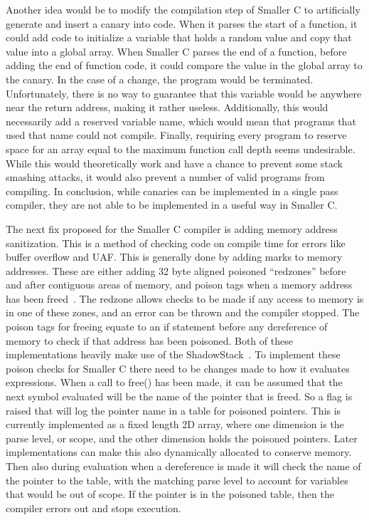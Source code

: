\documentclass[sigconf, anonymous]{acmart}
\begin{document}
Another idea would be to modify the compilation step of Smaller C to artificially generate and insert a canary into code. When it parses the start of a function, it could add code to initialize a variable that holds a random value and copy that value into a global array. When Smaller C parses the end of a function, before adding the end of function code, it could compare the value in the global array to the canary. In the case of a change, the program would be terminated. Unfortunately, there is no way to guarantee that this variable would be anywhere near the return address, making it rather useless. Additionally, this would necessarily add a reserved variable name, which would mean that programs that used that name could not compile. Finally, requiring every program to reserve space for an array equal to the maximum function call depth seems undesirable. While this would theoretically work and have a chance to prevent some stack smashing attacks, it would also prevent a number of valid programs from compiling. In conclusion, while canaries can be implemented in a single pass compiler, they are not able to be implemented in a useful way in Smaller C.




The next fix proposed for the Smaller C compiler is adding memory address sanitization. This is a method of checking code on compile time for errors like buffer overflow and UAF. This is generally done by adding marks to memory addresses. These are either adding 32 byte aligned poisoned “redzones” before and after contiguous areas of memory, and poison tags when a memory address has been freed~\cite{AddressSanitizeWiki}. The redzone allows checks to be made if any access to memory is in one of these zones, and an error can be thrown and the compiler stopped. The poison tags for freeing equate to an if statement before any dereference of memory to check if that address has been poisoned. Both of these implementations heavily make use of the ShadowStack~\cite{Serebryany:AddressSanitize}. To implement these poison checks for Smaller C there need to be changes made to how it evaluates expressions. When a call to free() has been made, it can be assumed that the next symbol evaluated will be the name of the pointer that is freed. So a flag is raised that will log the pointer name in a table for poisoned pointers. This is currently implemented as a fixed length 2D array, where one dimension is the parse level, or scope, and the other dimension holds the poisoned pointers. Later implementations can make this also dynamically allocated to conserve memory. Then also during evaluation when a dereference is made it will check the name of the pointer to the table, with the matching parse level to account for variables that would be out of scope. If the pointer is in the poisoned table, then the compiler errors out and stops execution.
\end{document}
